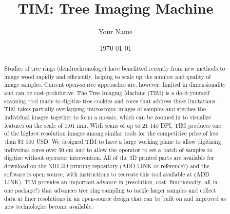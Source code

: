 \documentclass[a4paper,12pt]{article}
\title{TIM: Tree Imaging Machine} %
\author{Your Name}
\date{\today}
\begin{document}
\maketitle


\begin{abstract} 
Studies of tree rings (dendrochronology) have benefitted recently from new methods to image wood rapidly and efficiently, helping to scale up the number and quality of image samples. Current open-source approaches are, however, limited in dimensionality and can be cost-prohibitive. The Tree Imaging Machine (TIM) is a do-it-yourself scanning tool made to digitize tree cookies and cores that address these limitations. TIM takes partially overlapping microscopic images of samples and stitches the individual images together to form 
a mosaic, which can be zoomed in to visualize features on the scale of 0.01 mm. With scans of up to 21 140 DPI, TIM produces one of the highest resolution images among similar tools for the competitive price of less than \$3 000 USD.
We designed TIM to have a large working plane to allow digitizing individual cores over 50 cm and to allow the operator to set a batch of samples to digitize without operator intervention.  %
All of the 3D printed parts are available for download on the NIH 3D printing repository (ADD LINK or reference?) and the software is 
open source, with instructions to recreate this tool available at (ADD LINK). TIM provides an important advance in (resolution, cost, functionality, all-in-one package?) that advances tree ring sampling to tackle larger samples and collect data at finer resolutions in an open-source design that can be built on and improved as new technologies become available. %
\end{abstract}
\end{document}
